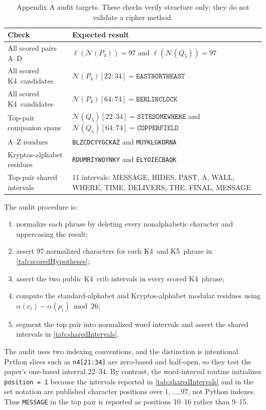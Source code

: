 \documentclass[12pt]{paperFormatting}
\newcommand{\Kfour}{K4}
\newcommand{\Kfive}{K5}
\newcommand{\Norm}{\mathcal{N}}
\newcommand{\Len}{\ell}
\begin{document}
\begin{thesisbody}
\begin{theappendices}
\begin{table}[H]
\caption{Appendix A audit targets. These checks verify structure only; they do not validate a cipher method.}
\label{tab:appendixAudit}
\centering
\small
\begin{tabular}{L{0.40\textwidth}L{0.44\textwidth}}
\toprule
Check & Expected result \\
\midrule
All scored pairs A--D & $\Len(\Norm(P_4))=97$ and $\Len(\Norm(Q_5))=97$ \\
All scored \Kfour\ candidates & $\Norm(P_4)[22:34]=\texttt{EASTNORTHEAST}$ \\
All scored \Kfour\ candidates & $\Norm(P_4)[64:74]=\texttt{BERLINCLOCK}$ \\
Top-pair companion spans & $\Norm(Q_5)[22:34]=\texttt{SITESOMEWHERE}$ and $\Norm(Q_5)[64:74]=\texttt{COPPERFIELD}$ \\
A--Z residues & \texttt{BLZCDCYYGCKAZ} and \texttt{MUYKLGKORNA} \\
Kryptos-alphabet residues & \texttt{RDUMRIYWOYNKY} and \texttt{ELYOIECBAQK} \\
Top-pair shared intervals & 11 intervals: MESSAGE, HIDES, PAST, A, WALL, WHERE, TIME, DELIVERS, THE, FINAL, MESSAGE \\
\bottomrule
\end{tabular}
\end{table}

The audit procedure is:
\begin{enumerate}
    \item normalize each phrase by deleting every nonalphabetic character and uppercasing the result;
    \item assert 97 normalized characters for each \Kfour\ and \Kfive\ phrase in \autoref{tab:scoredHypotheses};
    \item assert the two public \Kfour\ crib intervals in every scored \Kfour\ phrase;
    \item compute the standard-alphabet and Kryptos-alphabet modular residues using $\alpha(c_i)-\alpha(p_i)\bmod 26$;
    \item segment the top pair into normalized word intervals and assert the shared intervals in \autoref{tab:sharedIntervals}.
\end{enumerate}

The audit uses two indexing conventions, and the distinction is intentional. Python slices such as \texttt{n4[21:34]} are zero-based and half-open, so they test the paper's one-based interval 22--34. By contrast, the word-interval routine initializes \texttt{position = 1} because the intervals reported in \autoref{tab:sharedIntervals} and in the set notation are published character positions over $1,\ldots,97$, not Python indexes. Thus \texttt{MESSAGE} in the top pair is reported as positions 10--16 rather than 9--15.


\end{theappendices}
\end{thesisbody}
\end{document}
